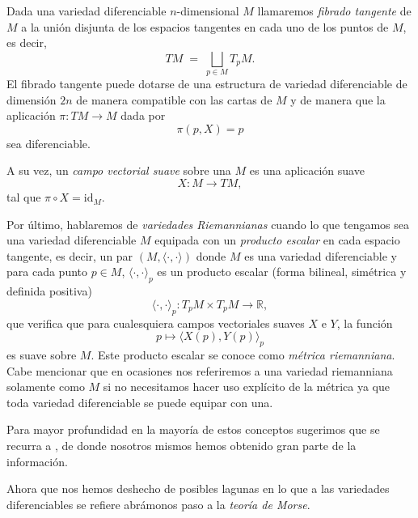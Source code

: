 \bigskip

Dada una variedad diferenciable $n$-dimensional $M$ llamaremos \textit{fibrado tangente} de $M$ a la unión disjunta de los espacios tangentes en cada uno de los puntos de $M$, es decir,
\[
TM \;=\; \bigsqcup_{p \in M} T_pM.
\]
El fibrado tangente puede dotarse de una estructura de variedad diferenciable de dimensión $2n$ de manera compatible con las cartas de $M$ y de manera que la aplicación $\pi: TM\to M$ dada por 
\[
\pi(p,X)=p
\]
sea diferenciable.

A su vez, un \textit{campo vectorial suave} sobre una $M$ es una aplicación suave
\[
X \colon M \to TM,
\]
tal que $\pi\circ X=\text{id}_M$.

\bigskip

Por último, hablaremos de \textit{variedades Riemannianas} cuando lo que tengamos sea una variedad diferenciable $M$ equipada con un \textit{producto escalar} en cada espacio tangente, es decir, un par $(M,\langle\cdot,\cdot\rangle)$ donde $M$ es una variedad diferenciable y para cada punto $p \in M$, $\langle\cdot,\cdot\rangle_p$ es un producto escalar (forma bilineal, simétrica y definida positiva)
  \[
    \langle\cdot,\cdot\rangle_p \colon T_pM \times T_pM \to \mathbb{R},
  \]
que verifica que para cualesquiera campos vectoriales suaves $X$ e $Y$, la función
  \[
    p \mapsto \langle X(p), Y(p) \rangle_p
  \]
es suave sobre $M$. Este producto escalar se conoce como \textit{métrica riemanniana}. Cabe mencionar que en ocasiones nos referiremos a una variedad riemanniana solamente como $M$ si no necesitamos hacer uso explícito de la métrica ya que toda variedad diferenciable se puede equipar con una.

\bigskip

Para mayor profundidad en la mayoría de estos conceptos sugerimos que se recurra a \cite{GonzalezPrietoVariedades}, de donde nosotros mismos hemos obtenido gran parte de la información. 

Ahora que nos hemos deshecho de posibles lagunas en lo que a las variedades diferenciables se refiere abrámonos paso a la \textit{teoría de Morse}.